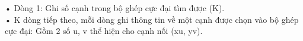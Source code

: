 • Dòng 1: Ghi số cạnh trong bộ ghép cực đại tìm được (K).   
\\   • K dòng tiếp theo, mỗi dòng ghi thông tin về một cạnh được chọn vào bộ ghép cực đại: Gồm 2 số u, v thể hiện cho cạnh nối (xu, yv).
